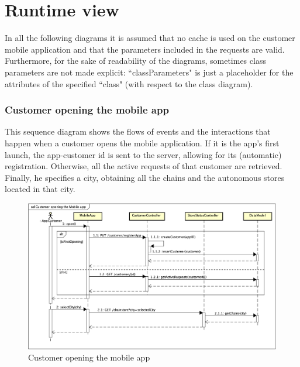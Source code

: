 \documentclass[a4paper,oneside,11pt]{book}
\begin{document}
    \newpage
    \section{Runtime view}
    In all the following diagrams it is assumed that no cache is used on the customer mobile application and that the parameters included in the requests are valid. Furthermore, for the sake of readability of the diagrams, sometimes class parameters are not made explicit: ``classParameters" is just a placeholder for the attributes of the specified ``class" (with respect to the class diagram).
    \subsubsection{Customer opening the mobile app}
    This sequence diagram shows the flows of events and the interactions that happen when a customer opens the mobile application. If it is the app's first launch, the app-customer id is sent to the server, allowing for its (automatic) registration. Otherwise, all the active requests of that customer are retrieved. Finally, he specifies a city, obtaining all the chains and the autonomous stores located in that city. 
    \begin{figure}[H]
        \centering
        \includegraphics[width=\textwidth, height=\textheight, keepaspectratio]{pictures/sequence_diagrams/customer_opening_mobile_app}
        \caption{Customer opening the mobile app}
        \label{figure:customer_opening_mobile_app}
    \end{figure}
\end{document}
